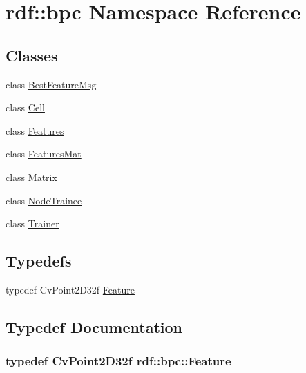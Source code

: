 \hypertarget{namespacerdf_1_1bpc}{}\section{rdf\+:\+:bpc Namespace Reference}
\label{namespacerdf_1_1bpc}
\subsection*{Classes}
\begin{DoxyCompactItemize}
\item 
class \hyperlink{classrdf_1_1bpc_1_1BestFeatureMsg}{Best\+Feature\+Msg}
\item 
class \hyperlink{classrdf_1_1bpc_1_1Cell}{Cell}
\item 
class \hyperlink{classrdf_1_1bpc_1_1Features}{Features}
\item 
class \hyperlink{classrdf_1_1bpc_1_1FeaturesMat}{Features\+Mat}
\item 
class \hyperlink{classrdf_1_1bpc_1_1Matrix}{Matrix}
\item 
class \hyperlink{classrdf_1_1bpc_1_1NodeTrainee}{Node\+Trainee}
\item 
class \hyperlink{classrdf_1_1bpc_1_1Trainer}{Trainer}
\end{DoxyCompactItemize}
\subsection*{Typedefs}
\begin{DoxyCompactItemize}
\item 
typedef Cv\+Point2\+D32f \hyperlink{namespacerdf_1_1bpc_a507d4ac6b23164245625d13196e564bc}{Feature}
\end{DoxyCompactItemize}


\subsection{Typedef Documentation}
\subsubsection[{\texorpdfstring{Feature}{Feature}}]{\setlength{\rightskip}{0pt plus 5cm}typedef Cv\+Point2\+D32f {\bf rdf\+::bpc\+::\+Feature}}\hypertarget{namespacerdf_1_1bpc_a507d4ac6b23164245625d13196e564bc}{}\label{namespacerdf_1_1bpc_a507d4ac6b23164245625d13196e564bc}
